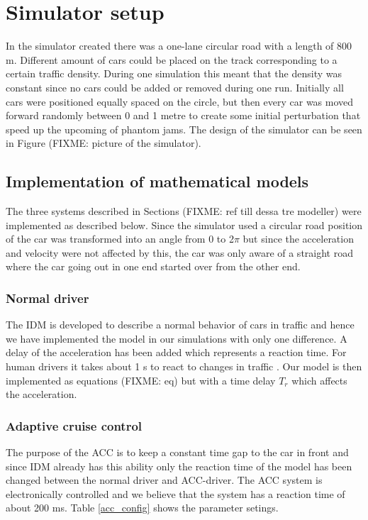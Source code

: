 \section{Simulator setup}
In the simulator created there was a one-lane circular road with a length of
800 m. Different amount of cars could be placed on the track corresponding to
a certain traffic density. During one simulation this meant that the density
was constant since no cars could be added or removed during one run. Initially
all cars were positioned equally spaced on the circle, but then every car
was moved forward randomly between 0 and 1 metre to create some initial
perturbation that speed up the upcoming of phantom jams. The design of the
simulator can be seen in Figure (FIXME: picture of the simulator).

\subsection{Implementation of mathematical models}
The three systems described in Sections (FIXME: ref till dessa tre modeller)
were implemented as described below. Since the simulator used a circular road
position of the car was transformed into an angle from 0 to 2\begin{math}\pi
\end{math} but since the acceleration and velocity were not affected by this,
the car was only aware of a straight road where the car going out in one
end started over from the other end.

\subsubsection {Normal driver}
The IDM is developed to describe a normal behavior of cars in traffic
and hence we have implemented the model in our simulations with only one
difference. A delay of the acceleration has been added which represents a
reaction time. For human drivers it takes about 1 s to react to changes in
traffic \cite{idm}. Our model is then implemented as equations (FIXME: eq)
but with a time delay \begin{math}T_r\end{math} which affects the acceleration.

\subsubsection {Adaptive cruise control }
The purpose of the ACC is to keep a constant time gap to the car in front
and since IDM already has this ability only the reaction time of the model
has been changed between the normal driver and ACC-driver. The ACC system
is electronically controlled and we believe that the system has a reaction
time of about 200 ms. Table \ref{acc_config} shows the parameter setings.


